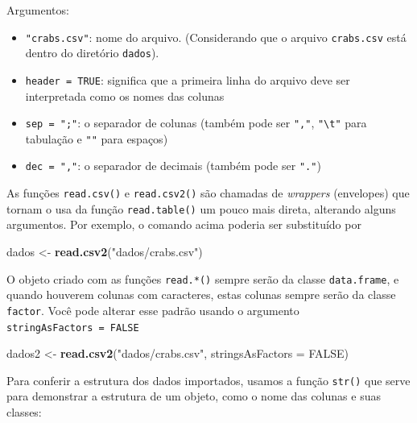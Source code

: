 \documentclass[10pt,a4paper]{book}
\newenvironment{Shaded}{\begin{snugshade}}{\end{snugshade}}
\newcommand{\KeywordTok}[1]{\textcolor[rgb]{0.13,0.29,0.53}{\textbf{#1}}}
\newcommand{\DataTypeTok}[1]{\textcolor[rgb]{0.13,0.29,0.53}{#1}}
\newcommand{\StringTok}[1]{\textcolor[rgb]{0.31,0.60,0.02}{#1}}
\newcommand{\OtherTok}[1]{\textcolor[rgb]{0.56,0.35,0.01}{#1}}
\newcommand{\NormalTok}[1]{#1}
\providecommand{\tightlist}{%
  \setlength{\itemsep}{0pt}\setlength{\parskip}{0pt}}
\begin{document}
Argumentos:

\begin{itemize}
\tightlist
\item
  \texttt{"crabs.csv"}: nome do arquivo. (Considerando que o arquivo
  \texttt{crabs.csv} está dentro do diretório \texttt{dados}).
\item
  \texttt{header\ =\ TRUE}: significa que a primeira linha do arquivo
  deve ser interpretada como os nomes das colunas
\item
  \texttt{sep\ =\ ";"}: o separador de colunas (também pode ser
  \texttt{","}, \texttt{"\textbackslash{}t"} para tabulação e
  \texttt{""} para espaços)
\item
  \texttt{dec\ =\ ","}: o separador de decimais (também pode ser
  \texttt{"."})
\end{itemize}

As funções \texttt{read.csv()} e \texttt{read.csv2()} são chamadas de
\emph{wrappers} (envelopes) que tornam o usa da função
\texttt{read.table()} um pouco mais direta, alterando alguns argumentos.
Por exemplo, o comando acima poderia ser substituído por

\begin{Shaded}
\begin{Highlighting}[]
\NormalTok{dados <-}\StringTok{ }\KeywordTok{read.csv2}\NormalTok{(}\StringTok{"dados/crabs.csv"}\NormalTok{)}
\end{Highlighting}
\end{Shaded}

O objeto criado com as funções \texttt{read.*()} sempre serão da classe
\texttt{data.frame}, e quando houverem colunas com caracteres, estas
colunas sempre serão da classe \texttt{factor}. Você pode alterar esse
padrão usando o argumento \texttt{stringAsFactors\ =\ FALSE}

\begin{Shaded}
\begin{Highlighting}[]
\NormalTok{dados2 <-}\StringTok{ }\KeywordTok{read.csv2}\NormalTok{(}\StringTok{"dados/crabs.csv"}\NormalTok{, }\DataTypeTok{stringsAsFactors =} \OtherTok{FALSE}\NormalTok{)}
\end{Highlighting}
\end{Shaded}

Para conferir a estrutura dos dados importados, usamos a função
\texttt{str()} que serve para demonstrar a estrutura de um objeto, como
o nome das colunas e suas classes:
\end{document}
